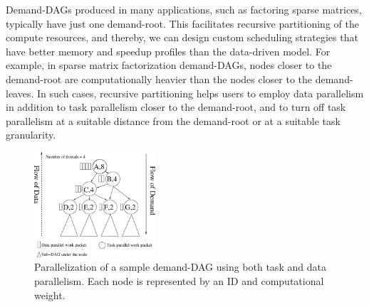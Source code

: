 \documentclass[10pt,conference]{IEEEtran}
\begin{document}
Demand-DAGs produced in many applications, such as factoring sparse matrices,
typically have just one demand-root.  This facilitates recursive partitioning
of the compute resources, and thereby, we can design custom scheduling
strategies that have better memory and speedup profiles than the data-driven
model. For example, in sparse matrix factorization demand-DAGs, nodes closer to
the demand-root are computationally heavier than the nodes closer to the
demand-leaves. In such cases, recursive partitioning helps users to employ data
parallelism in addition to task parallelism closer to the demand-root, and to
turn off task parallelism at a suitable distance from the demand-root
or at a suitable task granularity.
\begin{figure}[h]
\begin{center}
\includegraphics[width=0.40\textwidth]{figs/dag.eps}
\caption{Parallelization of a sample demand-DAG using both task and
         data parallelism. Each node is represented by an ID and 
         computational weight.}
\label{fig:dag}
\end{center}
\end{figure}
\end{document}
